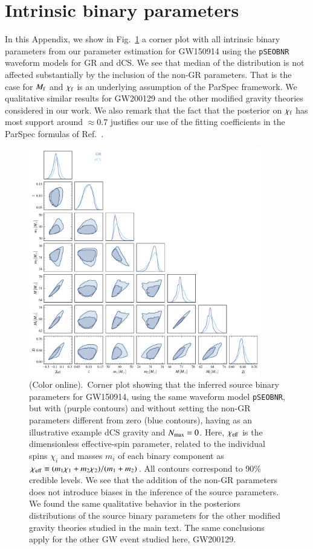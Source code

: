 \documentclass[twocolumn,
               prd,
               aps,
               superscriptaddress,
               tightenlines,
               nofootinbib,
               eqsecnum,
               amsfonts,
               amsmath,
               longbibliography]{revtex4-1}
\newcommand{\Mf}{M_{\rm f}}
\newcommand{\pSEOB}{\texttt{pSEOBNR}}
\begin{document}
\section{Intrinsic binary parameters}
\label{app:big_contour}

In this Appendix, we show in Fig.~\ref{fig:corner_plot_all} a corner plot with all intrinsic binary parameters from our parameter estimation for GW150914
using the \pSEOB{} waveform models for GR and dCS.
%
We see that median of the distribution is not affected substantially by the inclusion of the non-GR parameters.
%
That is the case for $\Mf$ and $\chi_{\rm f}$ is an underlying assumption of the ParSpec framework.
%
We qualitative similar results for GW200129 and the other modified gravity theories considered in our work.
%
We also remark that the fact that the posterior on $\chi_{\rm f}$ has most support around $\approx 0.7$ justifies our use
of the fitting coefficients in the ParSpec formulas of Ref.~\cite{Maselli:2019mjd}.


\begin{figure}[t]
\includegraphics[width=0.9\textwidth]{figs/tmp_GW150914_intrinsic_params.pdf}
\caption{(Color online).~Corner plot showing that the inferred source binary parameters for GW150914,
using the same waveform model \pSEOB, but with (purple contours) and without setting the non-GR parameters different
from zero (blue contours), having as an illustrative example dCS gravity and $N_{\rm max}=0$.
%
Here, $\chi_{\rm eff}$ is the dimensionless effective-spin parameter, related to the individual spins $\chi_{i}$
and masses $m_{i}$ of each binary component as $\chi_{\rm eff} \equiv (m_1 \chi_1 + m_2 \chi_2) / (m_1 + m_2)$.
%
All contours correspond to 90\% credible levels.
%
We see that the addition of the non-GR parameters does not introduce biases in the
inference of the source parameters.
%
We found the same qualitative behavior in the posteriors distributions of the
source binary parameters for the other modified gravity theories studied in the
main text.
%
The same conclusions apply for the other GW event studied here, GW200129.
}
\label{fig:corner_plot_all}
\end{figure}



\end{document}

